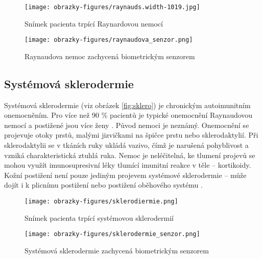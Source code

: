 \begin{figure}[!htbp]
  \begin{minipage}[b]{0.5\linewidth}
    \centering
    \texttt{[image: obrazky-figures/raynauds.width-1019.jpg]}
    \caption{Snímek pacienta trpící Raynardovou nemocí \cite{NHSRaynauds}}
    \label{fig:rayn}
  \end{minipage}
  \hspace{0.5cm}
  \begin{minipage}[b]{0.5\linewidth}
    \centering
    \texttt{[image: obrazky-figures/raynaudova\_senzor.png]}
    \caption{Raynaudova nemoc zachycená biometrickým senzorem \cite{Barotova}}
    \label{fig:raynsensor}
  \end{minipage}
\end{figure}
\subsection{Systémová sklerodermie}
Systémová sklerodermie (viz obrázek \ref{fig:sklero}) je chronickým autoimunitním onemocněním. Pro více než 90 \% pacientů je typické onemocnění Raynaudovou nemocí a postižené jsou více ženy \cite{InfluenceSkinDiseases}. Původ nemoci je neznámý. Onemocnění se projevuje otoky prstů, malými jizvičkami na špičce prstu nebo sklerodaktylií. Při sklerodaktylii se v tkáních ruky ukládá vazivo, čímž je narušená pohyblivost a vzniká charakteristická ztuhlá ruka. Nemoc je neléčitelná, ke tlumení projevů se mohou využít imunosupresivní léky tlumící imunitní reakce v těle -- kortikoidy. Kožní postižení není pouze jediným projevem systémové sklerodermie -- může dojít i k plicnímu postižení nebo postižení oběhového systému \cite{SystemovaSklerodermie}. 

\begin{figure}[!htbp]
  \begin{minipage}[b]{0.5\linewidth}
    \centering
    \texttt{[image: obrazky-figures/sklerodiermie.png]}
    \caption{Snímek pacienta trpící systémovou sklerodermií \cite{InfluenceSkinDiseases}}
    \label{fig:sklero}
  \end{minipage}
  \hspace{0.5cm}
  \begin{minipage}[b]{0.5\linewidth}
    \centering
    \texttt{[image: obrazky-figures/sklerodermie\_senzor.png]}
    \caption{Systémová sklerodermie zachycená biometrickým senzorem \cite{Barotova}}
     \label{fig:sklerosensor}
  \end{minipage}
\end{figure}

